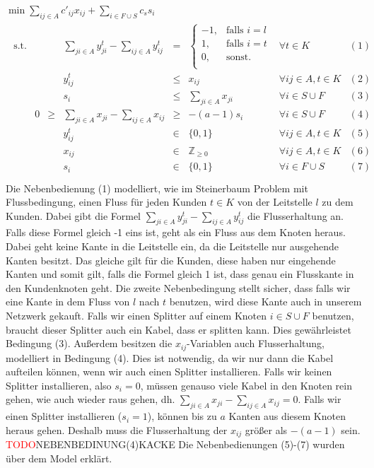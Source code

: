 \documentclass[11pt,a4paper]{article}
\newcommand{\Z}{\mathbb{Z}}
\newcommand{\TODO}{\textcolor{red}{TODO}}
\theoremstyle{my_th_style1}
\begin{document}
 \bigskip
 $\min \displaystyle\sum_{ij \in A} c'_{ij} x_{ij} + \displaystyle\sum_{i \in F \cup S} c_s s_i $
 \begin{align*}
 \begin{array}{rcrcrcll}
 \textrm{s.t.}  
&& &\displaystyle\sum_{ji \in A} y_{ji}^t - \displaystyle\sum_{ij \in A} y_{ij}^t& = & \left\{\begin{array}{cl} 
 -1, & \text{falls } i=l\\ 
 1, & \text{falls } i=t\\ 
 0, & \text{sonst.}\\ 
 \end{array}
 \right. & \forall t \in K & (1) \\
 &&& y_{ij}^t & \leq & x_{ij} & \forall ij \in A, t\in K & (2)\\
 &&& s_i &\leq& \displaystyle\sum_{ji \in A} x_{ji}& \forall  i \in S \cup F& (3)\\ 
 &0&\geq&\displaystyle\sum_{ji \in A} x_{ji} - \displaystyle\sum_{ij \in A} x_{ij}&\geq& -(a-1)s_i & \forall i \in S \cup F& (4)\\
 &&& y_{ij}^t & \in & \{0,1 \}& \forall ij \in A, t \in K & (5)\\
 &&& x_{ij} & \in & \Z _{\geq 0}& \forall ij \in A, t \in K & (6)\\
 &&& s_i & \in & \{ 0,1 \} & \forall i \in F \cup S & (7) \\
 \end{array}
 \end{align*}
 Die Nebenbedienung (1) modelliert, wie im Steinerbaum Problem mit Flussbedingung, einen Fluss für jeden Kunden $t \in K$ von der Leitstelle $l$ zu dem Kunden. Dabei gibt die Formel $\displaystyle\sum_{ji \in A} y_{ji}^t - \displaystyle\sum_{ij \in A} y_{ij}^t$ die Flusserhaltung an. Falls diese Formel gleich -1 eins ist, geht als ein Fluss aus dem Knoten heraus. Dabei geht keine Kante in die Leitstelle ein, da die Leitstelle nur ausgehende Kanten besitzt. Das gleiche gilt für die Kunden, diese haben nur eingehende Kanten und somit gilt, falls die Formel gleich 1 ist, dass genau ein Flusskante in den Kundenknoten geht. Die zweite Nebenbedingung stellt sicher, dass falls wir eine Kante in dem Fluss von $l$ nach $t$ benutzen, wird diese Kante auch in unserem Netzwerk gekauft. Falls wir einen Splitter auf einem Knoten $i \in S \cup F$ benutzen, braucht dieser Splitter auch ein Kabel, dass er splitten kann. Dies gewährleistet Bedingung (3). Außerdem besitzen die $x_{ij}$-Variablen auch Flusserhaltung, modelliert in Bedingung (4). Dies ist notwendig, da wir nur dann die Kabel aufteilen können, wenn wir auch einen Splitter installieren. Falls wir keinen Splitter installieren, also $s_i=0$, müssen genauso viele Kabel in den Knoten rein gehen, wie auch wieder raus gehen, dh. $\displaystyle\sum_{ji \in A} x_{ji} - \displaystyle\sum_{ij \in A} x_{ij}=0$. Falls wir einen Splitter installieren ($s_i=1$), können bis zu $a$ Kanten aus diesem Knoten heraus gehen. Deshalb muss die Flusserhaltung der $x_{ij}$ größer als $-(a-1)$ sein. \TODO NEBENBEDINUNG(4)KACKE
 Die Nebenbedienungen (5)-(7) wurden über dem Model erklärt.
  
\end{document}
